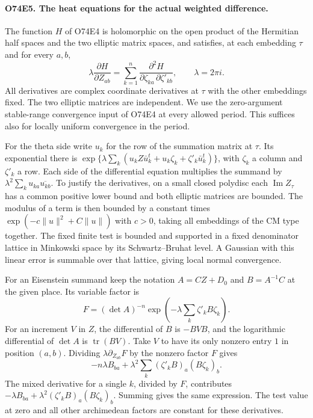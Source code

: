 \paragraph{O74E5. The heat equations for the actual weighted difference.}
The function $H$ of O74E4 is holomorphic on the open product of the
Hermitian half spaces and the two elliptic matrix spaces, and satisfies,
at each embedding $\tau$ and for every $a,b$,
\[
 \lambda\frac{\partial H}{\partial Z_{ab}}
  =\sum_{k=1}^n\frac{\partial^2 H}
       {\partial\zeta_{ka}\,\partial\zeta'_{kb}},\qquad \lambda=2\pi i.
\]
All derivatives are complex coordinate derivatives at $\tau$ with
the other embeddings fixed. The two elliptic matrices are independent.
We use the zero-argument stable-range convergence input of O74E4 at
every allowed period. This suffices also for locally uniform convergence
in the period.

For the theta side write $u_k$ for the row of the summation matrix at
$\tau$. Its exponential there is
$\exp\{\lambda\sum_k(u_k Z\bar u_k^t+u_k\zeta_k+
 \zeta'_k\bar u_k^t)\}$, with $\zeta_k$ a column and $\zeta'_k$ a row.
Each side of the differential equation multiplies the summand by
$\lambda^2\sum_k u_{ka}\overline{u_{kb}}$.
To justify the derivatives, on a small closed polydisc each
$\operatorname{Im} Z_\tau$ has a common positive lower bound and both
elliptic matrices are bounded. The modulus of a term is then bounded
by a constant times $\exp(-c\|u\|^2+C\|u\|)$ with $c>0$, taking
all embeddings of the CM type together. The fixed finite test is bounded
and supported in a fixed denominator lattice in Minkowski space by
its Schwartz--Bruhat level. A Gaussian with this linear error is
summable over that lattice, giving local normal convergence.

For an Eisenstein summand keep the notation $A=CZ+D_0$ and
$B=A^{-1}C$ at the given place. Its variable factor is
\[
 F=(\det A)^{-n}\exp\left(-\lambda\sum_k\zeta'_k B\zeta_k\right).
\]
For an increment $V$ in $Z$, the differential of $B$ is $-BVB$,
and the logarithmic differential of $\det A$ is $\operatorname{tr}(BV)$.
Take $V$ to have its only nonzero entry $1$ in position $(a,b)$.
Dividing $\lambda\partial_{Z_{ab}}F$ by the nonzero factor $F$ gives
\[
 -n\lambda B_{ba}+\lambda^2\sum_k(\zeta'_k B)_a(B\zeta_k)_b .
\]
The mixed derivative for a single $k$, divided by $F$, contributes
$-\lambda B_{ba}+\lambda^2(\zeta'_kB)_a(B\zeta_k)_b$.
Summing gives the same expression. The test value at zero and all
other archimedean factors are constant for these derivatives.

